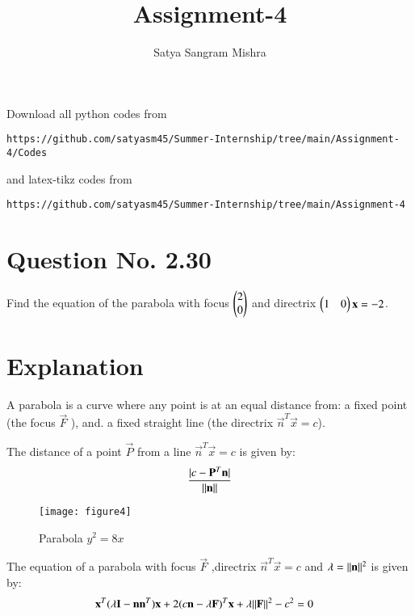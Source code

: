 \documentclass[journal,12pt,twocolumn]{IEEEtran}
\begin{document}
     \def\centbox#1{\makebox[0in]{#1}}
     \def\topbox#1{\raisebox{-\baselineskip}[0in][0in]{#1}}
     \def\midbox#1{\raisebox{-0.5\baselineskip}[0in][0in]{#1}}
\vspace{3cm}
\title{Assignment-4}
\author{Satya Sangram Mishra}
\maketitle
\newpage
\bigskip
\renewcommand{\thefigure}{\theenumi}
\renewcommand{\thetable}{\theenumi}
Download all python codes from 
\begin{lstlisting}
https://github.com/satyasm45/Summer-Internship/tree/main/Assignment-4/Codes
\end{lstlisting}
%
and latex-tikz codes from 
%
\begin{lstlisting}
https://github.com/satyasm45/Summer-Internship/tree/main/Assignment-4
\end{lstlisting}
%
\section{Question No. 2.30}
Find the equation of the parabola with focus $\begin{pmatrix}2\\0\end{pmatrix}$ and directrix $\begin{pmatrix}1&0\end{pmatrix}\mathbf{x}=-2$.
%
\section{Explanation}
\begin{definition}
\label{def}
A parabola is a curve where any point is at an equal distance from: a fixed point (the focus $\vec{F}$ ), and. a fixed straight line (the directrix $\vec{n}^T\vec{x}=c$).
\end{definition}
\begin{lemma}
\label{lemma}
The distance of a point $\vec{P}$ from a line $\vec{n}^T\vec{x}=c$ is given by:
\begin{align}
\frac{\vert c-\mathbf{P}^T\mathbf{n}\vert}{\Vert\mathbf{n}\rVert}   
\end{align}
\end{lemma}


\begin{figure}[!ht]
\centering
\texttt{[image: figure4]}
\caption{Parabola $y^2=8x$ }
\label{fig:parabola}	
\end{figure}


\begin{theorem}
The equation of a parabola with focus $\vec{F}$ ,directrix $\vec{n}^T\vec{x}=c$ and $\lambda=\Vert\mathbf{n}\rVert^2$ is given by:
\begin{align}
\mathbf{x}^T(\lambda\mathbf{I}-\mathbf{n}\mathbf{n}^T)\mathbf{x}+2(c\mathbf{n}-\lambda\mathbf{F})^T\mathbf{x}+\lambda\Vert\mathbf{F}\rVert^2-c^2&=0
\end{align}
\end{theorem}
\end{document}
